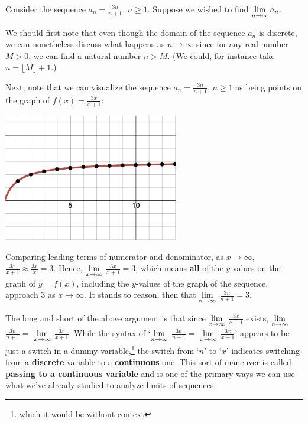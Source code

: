 Consider the sequence $a_{n} = \frac{3n}{n+1}$, $n \geq 1$. Suppose we wished to find $\displaystyle{\lim_{n \rightarrow \infty} a_{n}}$.

\medskip

We should first note that even though the domain of the sequence $a_{n}$ is discrete, we can nonetheless discuss what happens as $n \rightarrow \infty$ since for any real number $M>0$, we can find a natural number $n > M$.  (We could, for instance take $n  = \lfloor M \rfloor + 1$.)  

\medskip

Next, note that we can visualize  the sequence $a_{n} = \frac{3n}{n+1}$, $n \geq 1$ as being points on the graph of $f(x) = \frac{3x}{x+1}$:

\begin{center}

\includegraphics[width=3in]{./SequenceGraphics/sequenceoncurve.png}

\end{center}

Comparing leading terms of numerator and denominator, as $x \rightarrow \infty$, $\frac{3x}{x+1} \approx \frac{3x}{x} = 3$.   Hence,  $\displaystyle{\lim_{x \rightarrow \infty}}$ $\frac{3x}{x+1} = 3$, which means \textbf{all} of the $y$-values on the graph of $y = f(x)$, including the $y$-values of the graph of the sequence,  approach $3$ as $x \rightarrow \infty$.  It stands to reason, then that $\displaystyle{\lim_{n \rightarrow \infty}}$  $\frac{3n}{n+1} = 3$.


\medskip

The long and short of the above argument is that since $\displaystyle{\lim_{x\rightarrow \infty}}$ $\frac{3x}{x+1}$ exists, $\displaystyle{\lim_{n \rightarrow \infty}}$   $\frac{3n}{n+1} = $ $\displaystyle{\lim_{x \rightarrow \infty}}$ $\frac{3x}{x+1}$.  While the syntax of `$\displaystyle{\lim_{n \rightarrow \infty}}$  $\frac{3n}{n+1} =$ $\displaystyle{\lim_{x \rightarrow \infty}}$  $\frac{3x}{x+1}$' appears to be just a switch in a dummy variable,\footnote{which it would be without context}  the switch from `$n$' to `$x$' indicates switching from a \textbf{discrete} variable to a \textbf{continuous} one. This sort of maneuver is called \textbf{passing to a continuous variable} and is one of the primary ways we can use what we've already studied to analyze limits of sequences.  


